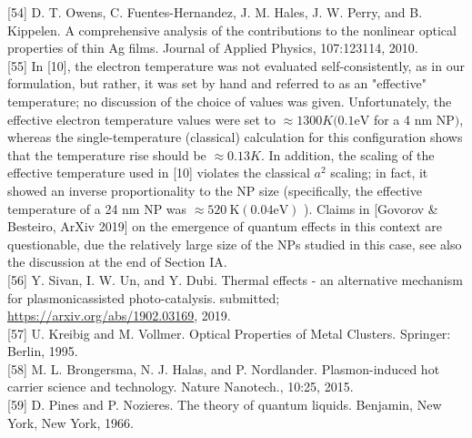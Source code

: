\documentclass[10pt]{article}
\begin{document}
[54] D. T. Owens, C. Fuentes-Hernandez, J. M. Hales, J. W. Perry, and B. Kippelen. A comprehensive analysis of the contributions to the nonlinear optical properties of thin Ag films. Journal of Applied Physics, 107:123114, 2010.\\[0pt]
[55] In [10], the electron temperature was not evaluated self-consistently, as in our formulation, but rather, it was set by hand and referred to as an "effective" temperature; no discussion of the choice of values was given. Unfortunately, the effective electron temperature values were set to $\approx 1300 K(0.1 \mathrm{eV}$ for a 4 nm NP$)$, whereas the single-temperature (classical) calculation for this configuration shows that the temperature rise should be $\approx 0.13 K$. In addition, the scaling of the effective temperature used in [10] violates the classical $a^{2}$ scaling; in fact, it showed an inverse proportionality to the NP size (specifically, the effective temperature of a 24 nm NP was $\approx 520 \mathrm{~K}(0.04 \mathrm{eV})$ ). Claims in [Govorov \& Besteiro, ArXiv 2019] on the emergence of quantum effects in this context are questionable, due the relatively large size of the NPs studied in this case, see also the discussion at the end of Section IA.\\[0pt]
[56] Y. Sivan, I. W. Un, and Y. Dubi. Thermal effects - an alternative mechanism for plasmonicassisted photo-catalysis. submitted; \href{https://arxiv.org/abs/1902.03169}{https://arxiv.org/abs/1902.03169}, 2019.\\[0pt]
[57] U. Kreibig and M. Vollmer. Optical Properties of Metal Clusters. Springer: Berlin, 1995.\\[0pt]
[58] M. L. Brongersma, N. J. Halas, and P. Nordlander. Plasmon-induced hot carrier science and technology. Nature Nanotech., 10:25, 2015.\\[0pt]
[59] D. Pines and P. Nozieres. The theory of quantum liquids. Benjamin, New York, New York, 1966.
\end{document}
